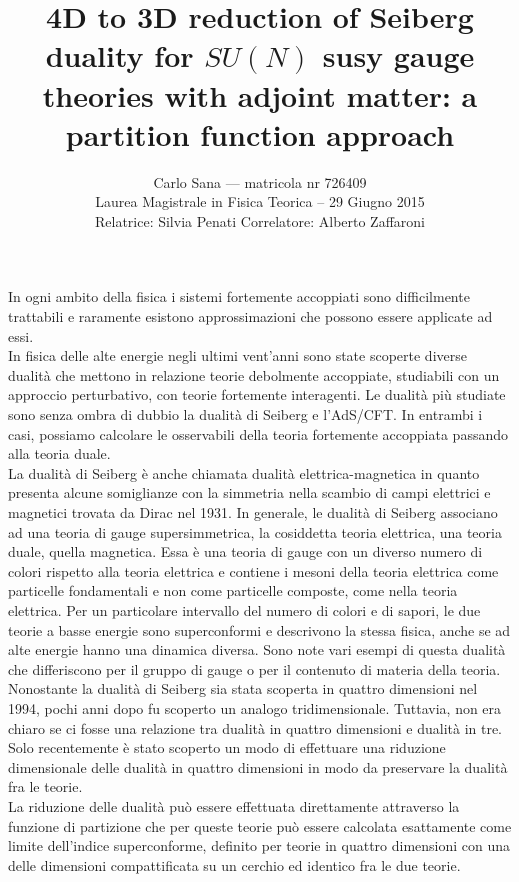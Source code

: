\documentclass[a4paper,12pt]{article}
\author{
 Carlo Sana  --- matricola nr 726409 \\
 Laurea Magistrale in Fisica Teorica -- 29 Giugno 2015\\
Relatrice: Silvia Penati 
Correlatore: Alberto Zaffaroni\\
}
\date{}
\title{ \textbf{4D to 3D reduction of Seiberg duality for $SU(N)$ susy gauge theories with adjoint matter: a partition function approach }}
\begin{document}
\maketitle
In ogni ambito della fisica i sistemi fortemente accoppiati sono difficilmente trattabili e raramente esistono approssimazioni che possono essere applicate ad essi.\\
In fisica delle alte energie negli ultimi vent'anni sono state scoperte diverse dualità che mettono in relazione teorie debolmente accoppiate, studiabili con un approccio perturbativo, con teorie fortemente interagenti.
Le dualità più studiate sono senza ombra di dubbio la dualità di Seiberg e l'AdS/CFT.
In entrambi i casi, possiamo calcolare le osservabili della teoria fortemente accoppiata passando alla teoria duale. \\
La dualità di Seiberg è anche chiamata dualità elettrica-magnetica in quanto presenta alcune somiglianze con la simmetria nella scambio di campi elettrici e magnetici trovata da Dirac nel 1931.
In generale, le dualità di Seiberg associano ad una teoria di gauge supersimmetrica, la cosiddetta teoria elettrica, una teoria duale, quella magnetica.
Essa è una teoria di gauge con un diverso numero di colori rispetto alla teoria elettrica e contiene i mesoni della teoria elettrica come particelle fondamentali e non come particelle composte, come nella teoria elettrica.
Per un particolare intervallo del numero di colori e di sapori, le due teorie a basse energie sono superconformi e descrivono la stessa fisica, anche se ad alte energie hanno una dinamica diversa.
Sono note vari esempi di questa dualità che differiscono per il gruppo di gauge o per il contenuto di materia della teoria.\\
Nonostante la dualità di Seiberg sia stata scoperta in quattro dimensioni nel 1994, pochi anni dopo fu scoperto un analogo tridimensionale.
Tuttavia, non era chiaro se ci fosse una relazione tra dualità in quattro dimensioni e dualità in tre.
Solo recentemente è stato scoperto un modo di effettuare una riduzione dimensionale delle dualità in quattro dimensioni in modo da preservare la dualità fra le teorie. \\
La riduzione delle dualità può essere effettuata direttamente attraverso la funzione di partizione che per queste teorie può essere calcolata esattamente come limite dell'indice superconforme, definito per teorie in quattro dimensioni con una delle dimensioni compattificata su un cerchio ed identico fra le due teorie.
\end{document}

